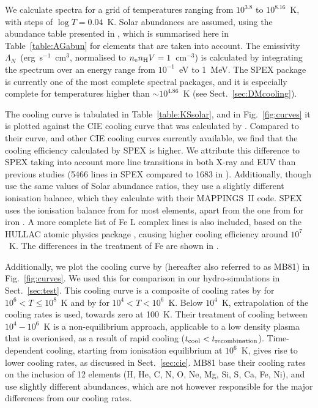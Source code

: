 \documentclass[floatfix,traditabstract,preprint2]{aa}
\begin{document}
We calculate spectra for a grid of temperatures ranging from $10^{3.8}$ to $10^{8.16}$~K, with steps of $\log T=0.04$~K. Solar abundances are assumed, using the abundance table presented in \citet{1989AndersGrevesse}, which is summarised here in Table~\ref{table:AGabun} for elements that are taken into account. The emissivity $\Lambda_N$~(erg~s$^{-1}$~cm$^{3}$, normalised to $n_{\rm e} n_{\rm H}V=1$~cm$^{-3}$) is calculated by integrating the spectrum over an energy range from $10^{-1}$~eV to 1~MeV. The SPEX package is currently one of the most complete spectral packages, and it is especially complete for temperatures higher than $\sim 10^{4.86}$~K (see Sect.~\ref{sec:DMcooling}). 

The cooling curve is tabulated in Table~\ref{table:KSsolar}, and in Fig.~\ref{fig:curves} it is plotted against the CIE cooling curve that was calculated by \citet{1993SutherlandDopita}. Compared to their curve, and other CIE cooling curves currently available, we find that the cooling efficiency calculated by SPEX is higher. We attribute this difference to SPEX taking into account more line transitions in both X-ray and EUV than previous studies (5466 lines in SPEX compared to 1683 in \citet{1993SutherlandDopita}). Additionally, though \citet{1993SutherlandDopita} use the same values of Solar abundance ratios, they use a slightly different ionisation balance, which they calculate with their MAPPINGS~II code. SPEX uses the ionisation balance from \citet{1985ArnaudRothenflug} for most elements, apart from the one from \citet{1992ArnaudRaymond} for iron \citep{1995Meweetal}. A more complete list of Fe L complex lines is also included, based on the HULLAC atomic physics package \citep{1977Klapischetal}, causing higher cooling efficiency around $10^7$~K. The differences in the treatment of Fe are shown in \citet{1995Meweetal}. 

Additionally, we plot the cooling curve by \citet{1981MacDonaldBailey} (hereafter also referred to as MB81) in Fig.~\ref{fig:curves}. We used this for comparison in our hydro-simulations in Sect.~\ref{sec:test}. This cooling curve is a composite of cooling rates by \citet{1976Raymondetal} for $10^6<T\le 10^8$~K and by \citet{1976ShapiroMoore} for $10^4<T<10^6$~K. Below $10^4$~K, extrapolation of the cooling rates is used, towards zero at 100~K. Their treatment of cooling between $10^4-10^6$~K is a non-equilibrium approach, applicable to a low density plasma that 
is overionised, as a result of rapid cooling ($t_{\rm cool} < t_{\rm recombination}$).
Time-dependent cooling, starting from ionisation equilibrium at $10^6$~K, gives rise to lower cooling rates, as discussed in Sect.~\ref{sec:cie}.  MB81 base their cooling rates on the inclusion of 12 elements (H, He, C, N, O, Ne, Mg, Si, S, Ca, Fe, Ni), and use slightly different abundances, which are not however responsible for the major differences from our cooling rates.
\end{document}

